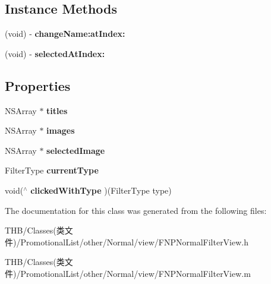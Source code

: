 \subsection*{Instance Methods}
\begin{DoxyCompactItemize}
\item 
\mbox{\label{interface_f_n_p_normal_filter_view_a54f37590b69261c4f59267befa71b148}} 
(void) -\/ {\bfseries change\+Name\+:at\+Index\+:}
\item 
\mbox{\label{interface_f_n_p_normal_filter_view_a479a9e660c10d898da9dd501cafe9f6f}} 
(void) -\/ {\bfseries selected\+At\+Index\+:}
\end{DoxyCompactItemize}
\subsection*{Properties}
\begin{DoxyCompactItemize}
\item 
\mbox{\label{interface_f_n_p_normal_filter_view_ac780927c9422dbcd9684018704a888ae}} 
N\+S\+Array $\ast$ {\bfseries titles}
\item 
\mbox{\label{interface_f_n_p_normal_filter_view_a6ed2e64b1b822c1b32dfcdbde23c0588}} 
N\+S\+Array $\ast$ {\bfseries images}
\item 
\mbox{\label{interface_f_n_p_normal_filter_view_a6314c92123e9d087144483ebd7c401cf}} 
N\+S\+Array $\ast$ {\bfseries selected\+Image}
\item 
\mbox{\label{interface_f_n_p_normal_filter_view_a5c65273a27a65a6e850a1f9fd04bafd1}} 
Filter\+Type {\bfseries current\+Type}
\item 
\mbox{\label{interface_f_n_p_normal_filter_view_a7bffd46d9a814e04291182bc633c08ef}} 
void($^\wedge$ {\bfseries clicked\+With\+Type} )(Filter\+Type type)
\end{DoxyCompactItemize}


The documentation for this class was generated from the following files\+:\begin{DoxyCompactItemize}
\item 
T\+H\+B/\+Classes(类文件)/\+Promotional\+List/other/\+Normal/view/F\+N\+P\+Normal\+Filter\+View.\+h\item 
T\+H\+B/\+Classes(类文件)/\+Promotional\+List/other/\+Normal/view/F\+N\+P\+Normal\+Filter\+View.\+m\end{DoxyCompactItemize}
